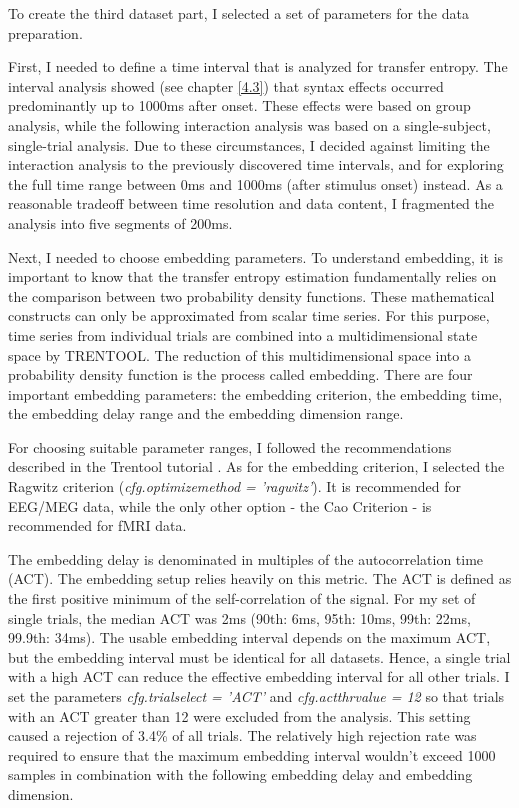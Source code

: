 To create the third dataset part, I selected a set of parameters for the data preparation.

First, I needed to define a time interval that is analyzed for transfer entropy.
The interval analysis showed (see chapter \ref{4.3}) that syntax effects occurred predominantly up to 1000ms after onset.
These effects were based on group analysis, while the following interaction analysis was based on a single-subject, single-trial analysis.
Due to these circumstances, I decided against limiting the interaction analysis to the previously discovered time intervals, and for exploring the full time range between 0ms and 1000ms (after stimulus onset) instead.
As a reasonable tradeoff between time resolution and data content, I fragmented the analysis into five segments of 200ms.

Next, I needed to choose embedding parameters.
To understand embedding, it is important to know that the transfer entropy estimation fundamentally relies on the comparison between two probability density functions.
These mathematical constructs can only be approximated from scalar time series.
For this purpose, time series from individual trials are combined into a multidimensional state space by TRENTOOL.
The reduction of this multidimensional space into a probability density function is the process called embedding.
There are four important embedding parameters: the embedding criterion, the embedding time, the embedding delay range and the embedding dimension range.

For choosing suitable parameter ranges, I followed the recommendations described in the Trentool tutorial \cite{3.3.TrentoolTutorial}.
As for the embedding criterion, I selected the Ragwitz criterion (\emph{cfg.optimizemethod = 'ragwitz'}).
It is recommended for EEG/MEG data, while the only other option - the Cao Criterion - is recommended for fMRI data.

The embedding delay is denominated in multiples of the autocorrelation time (ACT).
The embedding setup relies heavily on this metric.
The ACT is defined as the first positive minimum of the self-correlation of the signal.
For my set of single trials, the median ACT was 2ms (90th: 6ms, 95th: 10ms, 99th: 22ms, 99.9th: 34ms).
The usable embedding interval depends on the maximum ACT, but the embedding interval must be identical for all datasets.
Hence, a single trial with a high ACT can reduce the effective embedding interval for all other trials.
I set the parameters \emph{cfg.trialselect = 'ACT'} and \emph{cfg.actthrvalue = 12} so that trials with an ACT greater than 12 were excluded from the analysis.
This setting caused a rejection of 3.4\% of all trials.
The relatively high rejection rate was required to ensure that the maximum embedding interval wouldn't exceed 1000 samples in combination with the following embedding delay and embedding dimension.

